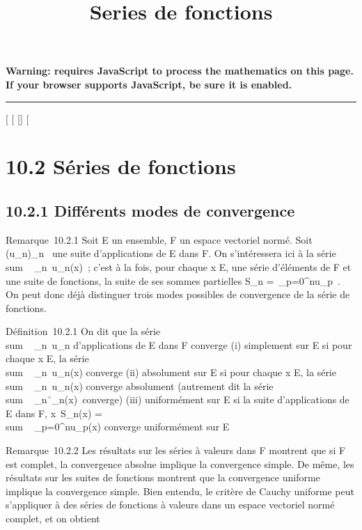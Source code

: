 \documentclass[]{article}
\title{Series de fonctions}
\author{}
\date{}
\begin{document}
\maketitle

\textbf{Warning: 
requires JavaScript to process the mathematics on this page.\\ If your
browser supports JavaScript, be sure it is enabled.}

\begin{center}\rule{3in}{0.4pt}\end{center}

[
[
[]
[

\section{10.2 Séries de fonctions}

\subsection{10.2.1 Différents modes de convergence}

Remarque~10.2.1 Soit E un ensemble, F un espace vectoriel normé. Soit
(u_n)_n\in{}~ une suite d'applications de E dans F. On
s'intéressera ici à la série
\\sum ~
_n\in{}~u_n(x)~; c'est à la fois, pour chaque x \in E, une
série d'éléments de F et une suite de fonctions, la suite de ses sommes
partielles S_n =\
\sum  _p=0^nu_p~. On peut
donc déjà distinguer trois modes possibles de convergence de la série de
fonctions.

Définition~10.2.1 On dit que la série
\\sum ~
_n\in{}~u_n d'applications de E dans F converge (i)
simplement sur E si pour chaque x \in E, la série
\\sum ~
_n\in{}~u_n(x) converge (ii) absolument sur E si pour chaque
x \in E, la série \\sum ~
_n\in{}~u_n(x) converge absolument (autrement dit la série
\\sum ~
_n\in{}~\u_n(x)\
converge) (iii) uniformément sur E si la suite d'applications de E dans
F, x\mapsto~S_n(x)
= \\sum ~
_p=0^nu_p(x) converge uniformément sur E

Remarque~10.2.2 Les résultats sur les séries à valeurs dans F montrent
que si F est complet, la convergence absolue implique la convergence
simple. De même, les résultats sur les suites de fonctions montrent que
la convergence uniforme implique la convergence simple. Bien entendu, le
critère de Cauchy uniforme peut s'appliquer à des séries de fonctions à
valeurs dans un espace vectoriel normé complet, et on obtient
\end{document}
